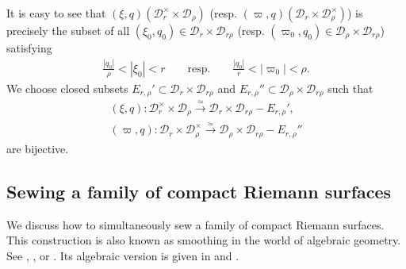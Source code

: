 \documentclass[12pt,a4paper,notitlepage]{article}
\theoremstyle{definition}
\theoremstyle{plain}
\newcommand{\mc}{\mathcal}
\numberwithin{equation}{section}
\begin{document}
It is easy to see that  $(\xi,q)(\mc D_r^\times\times\mc D_\rho)$ (resp. $(\varpi,q)(\mc D_r\times\mc D_\rho^\times)$) is precisely the subset of all $(\xi_0,q_0)\in\mc D_r\times\mc D_{r\rho}$ (resp. $(\varpi_0,q_0)\in\mc D_\rho\times\mc D_{r\rho}$) satisfying
\begin{align}
\frac{|q_0|}{\rho}<|\xi_0|<r\qquad\text{resp.}\qquad  \frac{|q_0|}{r}<|\varpi_0|<\rho.
\end{align}
We choose closed subsets $E_{r,\rho}'\subset \mc D_r\times\mc D_{r\rho}$ and $E_{r,\rho}''\subset\mc D_\rho\times\mc D_{r\rho}$ such that
\begin{gather}
(\xi,q):\mc D_r^\times\times\mc D_\rho\xrightarrow{\simeq}\mc D_r\times\mc D_{r\rho}-E_{r,\rho}',\nonumber\\
(\varpi,q): \mc D_r\times\mc D_\rho^\times\xrightarrow{\simeq}\mc D_\rho\times\mc D_{r\rho}-E_{r,\rho}''\label{eq11}
\end{gather}
are bijective.




\subsection*{Sewing a family of compact Riemann surfaces}

We discuss how to simultaneously sew a family of compact Riemann surfaces. This construction is also known as smoothing in the world of algebraic geometry. See \cite[Sec. 6.1]{TUY89}, \cite[Sec. 5.3]{Ueno97}, or \cite[Sec. XI.3]{ACG11}. Its algebraic version is given in \cite[Sec. 6]{Loo10} and \cite[Sec. 8.1]{DGT19b}.
\end{document}
